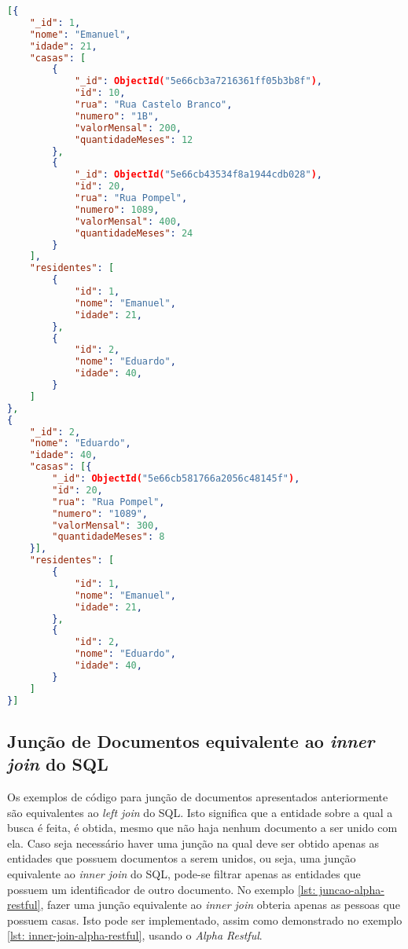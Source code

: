 \begin{lstlisting}[language=json, caption={Resultado da Junção de Documentos Com Residentes\label{lst: resultado-juncao-alpha-restful-relacionamento-inverso-do-relacionamento-inverso}}]
[{
    "_id": 1,
    "nome": "Emanuel",
    "idade": 21,
    "casas": [
        {
            "_id": ObjectId("5e66cb3a7216361ff05b3b8f"),
            "id": 10,
            "rua": "Rua Castelo Branco",
            "numero": "1B",
            "valorMensal": 200,
            "quantidadeMeses": 12
        },
        {
            "_id": ObjectId("5e66cb43534f8a1944cdb028"),
            "id": 20,
            "rua": "Rua Pompel",
            "numero": 1089,
            "valorMensal": 400,
            "quantidadeMeses": 24
        }
    ],
    "residentes": [
        {
            "id": 1,
            "nome": "Emanuel",
            "idade": 21,
        },
        {
            "id": 2,
            "nome": "Eduardo",
            "idade": 40,
        }
    ]
},
{
    "_id": 2,
    "nome": "Eduardo",
    "idade": 40,
    "casas": [{
        "_id": ObjectId("5e66cb581766a2056c48145f"),
        "id": 20,
        "rua": "Rua Pompel",
        "numero": "1089",
        "valorMensal": 300,
        "quantidadeMeses": 8
    }],
    "residentes": [
        {
            "id": 1,
            "nome": "Emanuel",
            "idade": 21,
        },
        {
            "id": 2,
            "nome": "Eduardo",
            "idade": 40,
        }
    ]
}]
\end{lstlisting}

\subsection{Junção de Documentos equivalente ao \textit{inner join} do SQL\label{subsection: inner-join-mongodb}}

Os exemplos de código para junção de documentos apresentados anteriormente são equivalentes ao \textit{left join} do SQL. Isto significa que a entidade sobre a qual a busca é feita, é obtida, mesmo que não haja nenhum documento a ser unido com ela. Caso seja necessário haver uma junção na qual deve ser obtido apenas as entidades que possuem documentos a serem unidos, ou seja, uma junção equivalente ao \textit{inner join} do SQL, pode-se filtrar apenas as entidades que possuem um identificador de outro documento. No exemplo \ref{lst: juncao-alpha-restful}, fazer uma junção equivalente ao \textit{inner join} obteria apenas as pessoas que possuem casas. Isto pode ser implementado, assim como demonstrado no exemplo \ref{lst: inner-join-alpha-restful}, usando o \textit{Alpha Restful}.


